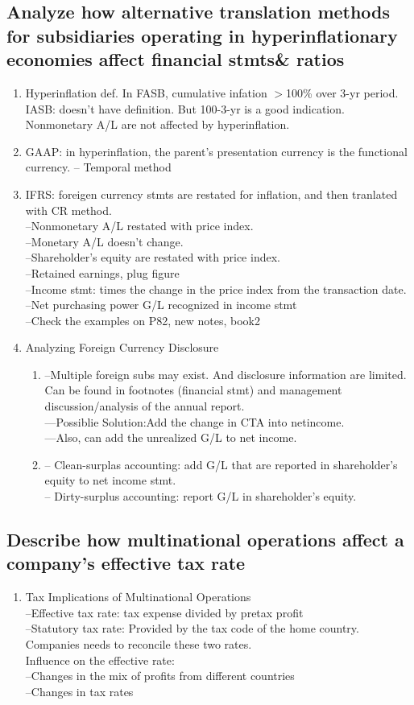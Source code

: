 \documentclass{article}
\newcommand{\be}{\begin{enumerate}}
\newcommand{\ee}{\end{enumerate}}
\begin{document}
\subsection{Analyze how alternative translation methods for subsidiaries operating
in hyperinflationary economies affect financial stmts\& ratios}
\be
    \item Hyperinflation def. In FASB, cumulative infation $>$100\% over 3-yr
        period. IASB: doesn't have definition. But 100-3-yr is a good indication.
        Nonmonetary A/L are not affected by hyperinflation.
    \item GAAP: in hyperinflation, the parent's presentation currency is the functional
        currency. -- Temporal method 
    \item IFRS: foreigen currency stmts are restated for inflation, and then tranlated
        with CR method.
        \\--Nonmonetary A/L restated with price index.
        \\--Monetary A/L doesn't change.
        \\--Shareholder's equity are restated with price index.
        \\--Retained earnings, plug figure
        \\--Income stmt: times the change in the price index from the transaction
        date.
        \\--Net purchasing power G/L recognized in income stmt
        \\--Check the examples on P82, new notes, book2
    \item Analyzing Foreign Currency Disclosure
        \be
        \item
        --Multiple foreign subs may exist. And disclosure information are limited.
        Can be found in footnotes (financial stmt) and management discussion/analysis
        of the annual report.
        \\---Possiblie Solution:Add the change in CTA into netincome.
        \\---Also, can add the unrealized G/L to net income.
        \item 
        -- Clean-surplas accounting: add G/L that are reported in shareholder's
        equity to net income stmt.
        \\-- Dirty-surplus accounting: report G/L in shareholder's equity.
        \ee
\ee
\subsection{Describe how multinational operations affect a company's effective tax rate}
\be
    \item Tax Implications of Multinational Operations
        \\--Effective tax rate: tax expense divided by pretax profit
        \\--Statutory tax rate: Provided by the tax code of the home country. 
        \\Companies needs to reconcile these two rates.
        \\Influence on the effective rate:
        \\--Changes in the mix of profits from different countries
        \\--Changes in tax rates
\ee
\end{document}
